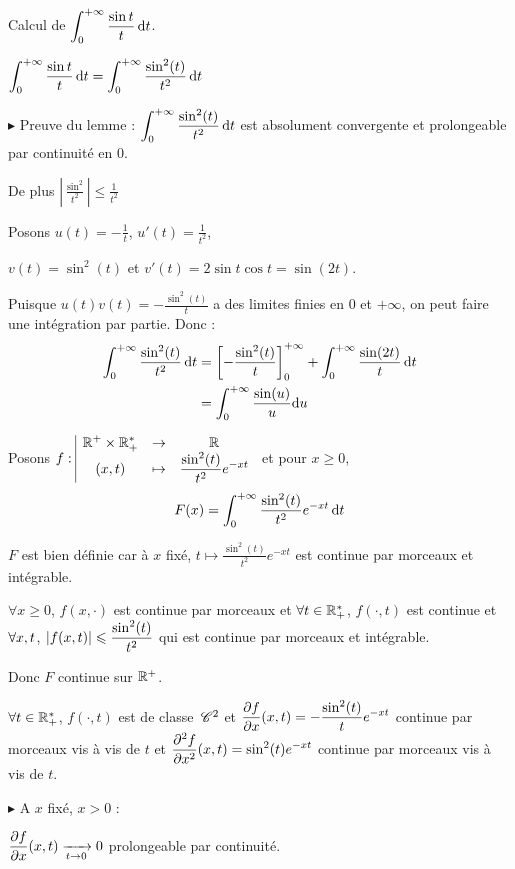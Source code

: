 \begin{exemple}
    Calcul de $\displaystyle \int_{0}^{+ \infty} \frac{\sin t}{t} \,\mathrm{d}t$.

     $\displaystyle \int_{0}^{+ \infty} \frac{\sin t }{t } \,\mathrm{d}t = \int_{0}^{+\infty} \frac{\sin^2(t)}{t^2} \,\mathrm{d}t$

    \avspace $\blacktriangleright$ Preuve du lemme : $\displaystyle \int_{0}^{+\infty} \frac{\sin^2(t)}{t^2} \,\mathrm{d}t $ est 
    absolument convergente  et prolongeable par continuité en $0$. 
    
    De plus $\left| \frac{\sin^2}{t^2} \right| \leqslant \frac 1 {t^2}$

    Posons $u(t) = - \frac 1 t$, $u'(t) = \frac 1 {t^2}$, 

    $v(t) = \sin^2(t)$ et $v'(t) = 2 \sin t \cos t = \sin(2t)$.

    Puisque $u(t)v(t) = - \frac{\sin^2(t)}{t}$ a des limites finies en $0$ et $+\infty$, on peut faire une intégration par partie. Donc : 
    \begin{align}
        \int_0^{+ \infty} \frac{\sin^2(t)}{t^2} \,\mathrm{d}t & = \left[ -\frac{\sin^2(t)}{t} \right]_0^{+ \infty} + \int_0^{+ \infty} \frac{\sin(2t)}{t} \,\mathrm{d}t \\
        & = \int_0^{+ \infty} \frac{\sin(u)}{u} \mathrm d u
    \end{align}

    Posons $f: \space \begin{array}{|ccc} \displaystyle \mathbb{R}^+ \times \mathbb{R}^*_+ & \to & \displaystyle \mathbb{R} \\ \displaystyle (x, t) & \mapsto & \displaystyle \frac{\sin^2(t)}{t^2}e^{-xt} \end{array}$ et pour $x \geqslant 0$, 
    $$F(x) = \int_0^{+ \infty} \frac{\sin^2(t)}{t^2} e^{-xt} \,\mathrm{d}t$$

    $F$ est bien définie car à $x$ fixé, $t \mapsto \frac{\sin^2(t)}{t^2} e^{-xt}$ est continue par morceaux et intégrable.

    $\forall x \geqslant 0$, $f(x, \cdot)$ est continue par morceaux et $\forall t \in \mathbb{R}_+^*$, $f(\cdot, t)$ est continue et 
    $\displaystyle \forall x, t$, $\displaystyle |f(x, t)| \leqslant \frac{\sin^2(t)}{t^2}$ qui est continue par morceaux et intégrable. 

    Donc $F$ continue sur $\mathbb{R}^+$. 

    $\forall t \in \mathbb{R}^*_+$, $f(\cdot, t)$ est de classe $\,\mathscr C^{2}$ et 
    $\displaystyle \frac{\partial f}{\partial x} (x, t) = - \frac{\sin^2(t)}{t}e^{-xt}$ continue par morceaux vis à vis de $t$ et 
    $\displaystyle \frac{\partial^{2} f}{\partial x^{2}}(x, t) = \sin^2(t) e^{-xt}$ continue par morceaux vis à vis de $t$.

    \avspace $\blacktriangleright$ A $x$ fixé, $x > 0$ : 

    $\displaystyle \frac{\partial f}{\partial x} (x, t) \xrightarrow[t \to 0 ]{} 0$ prolongeable par continuité. 


\end{exemple}
